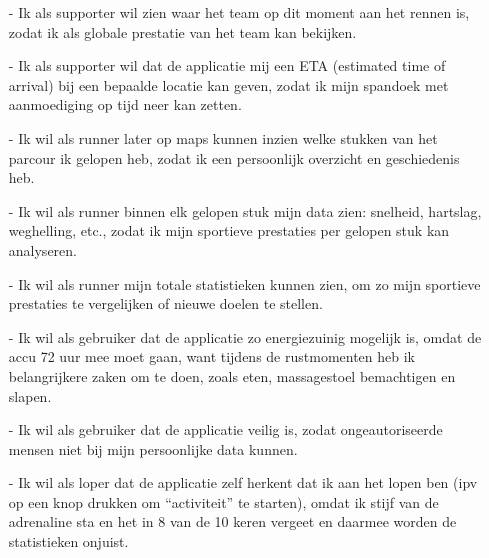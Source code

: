 \documentclass[../main.tex]{subfiles}
\begin{document}
	\begin{itemize}
		\item[-] Ik als supporter wil zien waar het team op dit moment aan het rennen is, zodat ik als globale
		prestatie van het team kan bekijken.
		\item[-] Ik als supporter wil dat de applicatie mij een ETA (estimated time of arrival) bij een bepaalde locatie
		kan geven, zodat ik mijn spandoek met aanmoediging op tijd neer kan zetten.
		\item[-] Ik wil als runner later op maps kunnen inzien welke stukken van het parcour ik gelopen heb, zodat ik
		een persoonlijk overzicht en geschiedenis heb.
		\item[-] Ik wil als runner binnen elk gelopen stuk mijn data zien: snelheid, hartslag, weghelling, etc., zodat ik
		mijn sportieve prestaties per gelopen stuk kan analyseren.
		\item[-] Ik wil als runner mijn totale statistieken kunnen zien, om zo mijn sportieve prestaties te vergelijken
		of nieuwe doelen te stellen.
		\item[-] Ik wil als gebruiker dat de applicatie zo energiezuinig mogelijk is, omdat de accu 72 uur mee moet
		gaan, want tijdens de rustmomenten heb ik belangrijkere zaken om te doen, zoals eten,
		massagestoel bemachtigen en slapen.
		\item[-] Ik wil als gebruiker dat de applicatie veilig is, zodat ongeautoriseerde mensen niet bij mijn
		persoonlijke data kunnen.
		\item[-] Ik wil als loper dat de applicatie zelf herkent dat ik aan het lopen ben (ipv op een knop drukken om
		“activiteit” te starten), omdat ik stijf van de adrenaline sta en het in 8 van de 10 keren vergeet en
		daarmee worden de statistieken onjuist.
	\end{itemize}
\end{document}
